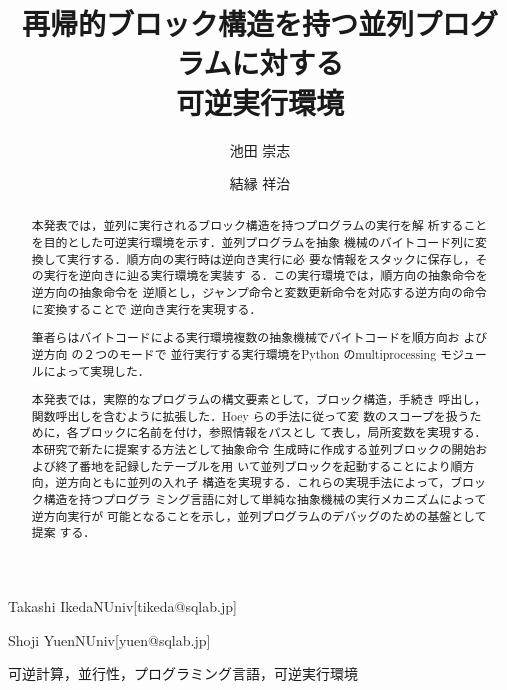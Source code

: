 \documentclass[submit,PRO]{ipsj}
\begin{document}
\title{再帰的ブロック構造を持つ並列プログラムに対する\\
      可逆実行環境}





\author{池田 崇志}{Takashi Ikeda}{NUniv}[tikeda@sqlab.jp]
\author{結縁 祥治}{Shoji Yuen}{NUniv}[yuen@sqlab.jp]


\begin{abstract}
本発表では，並列に実行されるブロック構造を持つプログラムの実行を解
析することを目的とした可逆実行環境を示す．並列プログラムを抽象
機械のバイトコード列に変換して実行する．順方向の実行時は逆向き実行に必
要な情報をスタックに保存し，その実行を逆向きに辿る実行環境を実装す
る．この実行環境では，順方向の抽象命令を逆方向の抽象命令を
逆順とし，ジャンプ命令と変数更新命令を対応する逆方向の命令に変換することで
逆向き実行を実現する．

筆者らはバイトコードによる実行環境複数の抽象機械でバイトコードを順方向お
よび逆方向%
の２つのモードで%
並行実行する実行環境をPython のmultiprocessing モジュー
ルによって実現した．

本発表では，実際的なプログラムの構文要素として，ブロック構造，手続き
呼出し，関数呼出しを含むように拡張した．Hoey らの手法に従って変
数のスコープを扱うために，各ブロックに名前を付け，参照情報をパスとし
て表し，局所変数を実現する．本研究で新たに提案する方法として抽象命令
生成時に作成する並列ブロックの開始および終了番地を記録したテーブルを用
いて並列ブロックを起動することにより順方向，逆方向ともに並列の入れ子
構造を実現する．これらの実現手法によって，ブロック構造を持つプログラ
ミング言語に対して単純な抽象機械の実行メカニズムによって逆方向実行が
可能となることを示し，並列プログラムのデバッグのための基盤として提案
する．
\end{abstract}


\begin{jkeyword}
可逆計算，並行性，プログラミング言語，可逆実行環境
\end{jkeyword}
\end{document}
